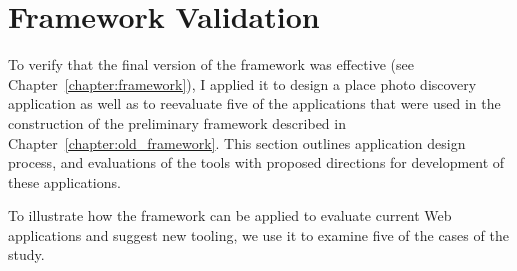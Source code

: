 \chapter{Framework Validation}
\label{chapter:evaluation}

To verify that the final version of the framework was effective (see Chapter~\ref{chapter:framework}), I applied it to design a place photo discovery application as well as to reevaluate five of the applications that were used in the construction of the preliminary framework described in Chapter~\ref{chapter:old_framework}. This section outlines application design process, and evaluations of the tools with proposed directions for development of these applications. 

To illustrate how the framework can be applied to evaluate current Web applications and suggest new tooling, we use it to examine five of the cases of the study.

